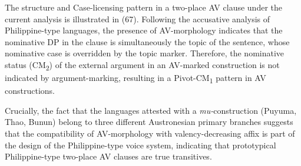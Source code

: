 \documentclass[10pt]{article}
\begin{document}
The structure and Case-licensing pattern in a two-place AV clause under the current analysis is illustrated in (67). Following the accusative analysis of Philippine-type languages, the presence of AV-morphology indicates that the nominative DP in the clause is simultaneously the topic of the sentence, whose nominative case is overridden by the topic marker. Therefore, the nominative status (CM\textsubscript{2}) of the external argument in an AV-marked construction is not indicated by argument-marking, resulting in a Pivot-CM\textsubscript{1} pattern in AV constructions.  

\begin{exe}

\end{exe}
\bigskip

Crucially, the fact that the languages attested with a \textit{mu-}construction (Puyuma, Thao, Bunun) belong to three different Austronesian primary branches suggests that the compatibility of AV-morphology with valency-decreasing affix is part of the design of the Philippine-type voice system, indicating that prototypical  Philippine-type two-place AV clauses are true transitives.
\end{document}
